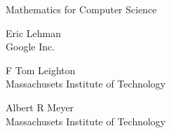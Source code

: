 \begin{center}
\begin{minipage}{4.5in}
\begin{center}
\rule{0in}{2in}
{\huge Mathematics for Computer Science}\\

\Stamp


\vspace{1in}
{\LARGE Eric Lehman}\\
{\large Google Inc.}

\vspace{0.3in}
{\LARGE F Tom Leighton}\\
{\large Massachusets Institute of Technology}

\vspace{0.3in}
{\LARGE Albert R Meyer}\\
{\large Massachusets Institute of Technology}

\end{center}

\end{minipage}
\end{center}
\coursecopyright

\tableofcontents

\endinput
